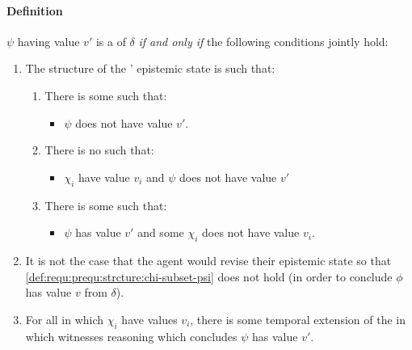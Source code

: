 \paragraph{Definition}

\begin{definition}
  \label{def:requ:prequ}
  \(\psi\) having value \(v'\) is a \emph{\prequ{}} of \(\delta\) \emph{if and only if} the following conditions jointly hold:
  \begin{enumerate}[label=\arabic*., ref=\named{P\(\Re\):\arabic*}]
  \item
    \label{def:requ:prequ:strcture}
    The structure of the \vAgent{}' epistemic state is such that:
    \begin{enumerate}[label=\alph*., ref=\named{P\(\Re\):1\alph*}]
    \item
      \label{def:requ:prequ:strcture:psi-not-v}
      There is some \epVW{} such that:
      \begin{itemize}
      \item
        \(\psi\) does not have value \(v'\).
      \end{itemize}
    \item
      \label{def:requ:prequ:strcture:chi-subset-psi}
      There is no \epVW{} such that:
      \begin{itemize}
      \item
        \(\chi_{i}\) have value \(v_{i}\) and \(\psi\) does not have value \(v'\)
      \end{itemize}
    \item
      \label{def:requ:prequ:strcture:chi-propersubset-psi}
      There is some \epVW{} such that:
      \begin{itemize}
      \item
        \(\psi\) has value \(v'\) and some \(\chi_{i}\) does not have value \(v_{i}\).
      \end{itemize}
    \end{enumerate}
  \item
    \label{def:requ:prequ:no-revision}
    It is not the case that the agent would revise their epistemic state so that \ref{def:requ:prequ:strcture:chi-subset-psi} does not hold (in order to conclude \(\phi\) has value \(v\) from \(\delta\)).
  \item
    \label{def:requ:prequ:possible-reason}
    For all \epVW{} in which \(\chi_{i}\) have values \(v_{i}\), there is some temporal extension of the \world{} in which \vAgent{} witnesses reasoning which concludes \(\psi\) has value \(v'\).
  \end{enumerate}
\end{definition}

